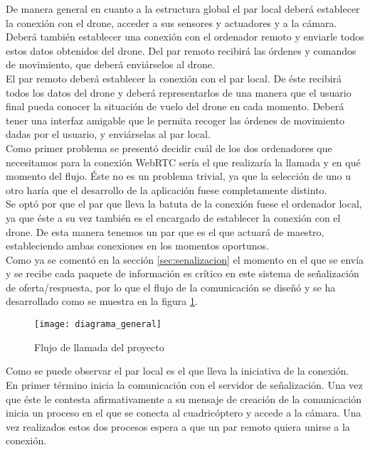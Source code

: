 De manera general en cuanto a la estructura global el par local deberá establecer la conexión con el drone, acceder a sus sensores y actuadores y a la cámara. Deberá también establecer una conexión con el ordenador remoto y enviarle todos estos datos obtenidos del drone. Del par remoto recibirá las órdenes y comandos de movimiento, que deberá enviárselos al drone.\\

El par remoto deberá establecer la conexión con el par local. De éste recibirá todos los datos del drone y deberá representarlos de una manera que el usuario final pueda conocer la situación de vuelo del drone en cada momento. Deberá tener una interfaz amigable que le permita recoger las órdenes de movimiento dadas por el usuario, y enviárselas al par local.\\

Como primer problema se presentó decidir cuál de los dos ordenadores que necesitamos para la conexión WebRTC sería el que realizaría la llamada y en qué momento del flujo. Éste no es un problema trivial, ya que la selección de uno u otro haría que el desarrollo de la aplicación fuese completamente distinto.\\

Se optó por que el par que lleva la batuta de la conexión fuese el ordenador local, ya que éste a su vez también es el encargado de  establecer la conexión con el drone. De esta manera tenemos un par que es el que actuará de maestro, estableciendo ambas conexiones en los momentos oportunos.\\

Como ya se comentó en la sección \ref{sec:senalizacion} el momento en el que se envía y se recibe cada paquete de información es crítico en este sistema de señalización de oferta/respuesta, por lo que el flujo de la comunicación se diseñó y se ha desarrollado como se muestra en la figura \ref{fig:flujodellamada}.\\


\begin{figure}[h!]
\centering
\texttt{[image: diagrama\_general]}
\caption{Flujo de llamada del proyecto}
\label{fig:flujodellamada}
\end{figure}

Como se puede observar el par local es el que lleva la iniciativa de la conexión. En primer término inicia la comunicación con el servidor de señalización. Una vez que éste le contesta afirmativamente a su mensaje de creación de la comunicación inicia un proceso en el que se conecta al cuadricóptero y accede a la cámara. Una vez realizados estos dos procesos espera a que un par remoto quiera unirse a la conexión.\\

